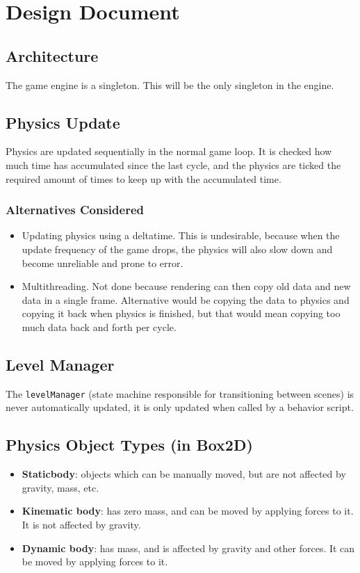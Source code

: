 \documentclass{article}
\begin{document}
\section*{Design Document}

\subsection{Architecture}
The game engine is a singleton. This will be the only singleton in the engine.

\subsection{Physics Update}
Physics are updated sequentially in the normal game loop. It is checked how much time has accumulated since the last cycle, and the physics are ticked the required amount of times to keep up with the accumulated time.

\subsubsection{Alternatives Considered}
\begin{itemize}
  \item Updating physics using a deltatime. This is undesirable, because when the update frequency of the game drops, the physics will also slow down and become unreliable and prone to error.
  \item Multithreading. Not done because rendering can then copy old data and new data in a single frame. Alternative would be copying the data to physics and copying it back when physics is finished, but that would mean copying too much data back and forth per cycle.
\end{itemize}

\subsection{Level Manager}
The \texttt{levelManager} (state machine responsible for transitioning between scenes) is never automatically updated, it is only updated when called by a behavior script.

\subsection{Physics Object Types (in Box2D)}
\begin{itemize}
  \item \textbf{Staticbody}: objects which can be manually moved, but are not affected by gravity, mass, etc.
  \item \textbf{Kinematic body}: has zero mass, and can be moved by applying forces to it. It is not affected by gravity.
  \item \textbf{Dynamic body}: has mass, and is affected by gravity and other forces. It can be moved by applying forces to it.
\end{itemize}
\end{document}
